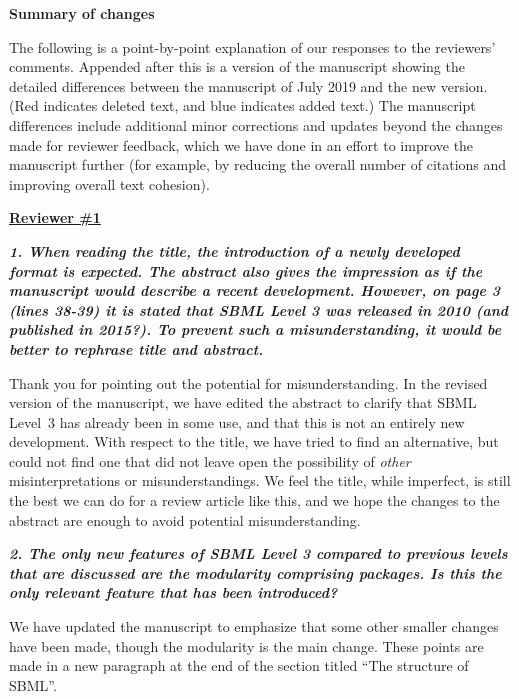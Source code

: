 \documentclass[11pt]{mhletter}
\begin{document}
\clearpage

\begin{center}
\textbf{\large Summary of changes}
\end{center}

The following is a point-by-point explanation of our responses to the reviewers' comments.  Appended after this is a version of the manuscript showing the detailed differences between the manuscript of July 2019 and the new version.  (Red indicates deleted text, and blue indicates added text.)  The manuscript differences include additional minor corrections and updates beyond the changes made for reviewer feedback, which we have done in an effort to improve the manuscript further (for example, by reducing the overall number of citations and improving overall text cohesion).

\vspace*{2ex}

\textbf{\underline{Reviewer \#1}}

\textbf{\textit{1. When reading the title, the introduction of a newly developed format is expected. The abstract also gives the impression as if the manuscript would describe a recent development. However, on page 3 (lines 38-39) it is stated that SBML Level 3 was released in 2010 (and published in 2015?). To prevent such a misunderstanding, it would be better to rephrase title and abstract.}}

Thank you for pointing out the potential for misunderstanding.  In the revised version of the manuscript, we have edited the abstract to clarify that SBML Level~3 has already been in some use, and that this is not an entirely new development.  With respect to the title, we have tried to find an alternative, but could not find one that did not leave open the possibility of \emph{other} misinterpretations or misunderstandings.  We feel the title, while imperfect, is still the best we can do for a review article like this, and we hope the changes to the abstract are enough to avoid potential misunderstanding.


\textbf{\textit{2. The only new features of SBML Level 3 compared to previous levels that are discussed are the modularity comprising packages. Is this the only relevant feature that has been introduced?}}

We have updated the manuscript to emphasize that some other smaller changes have been made, though the modularity is the main change.  These points are made in a new paragraph at the end of the section titled ``The structure of SBML''.
\end{document}
